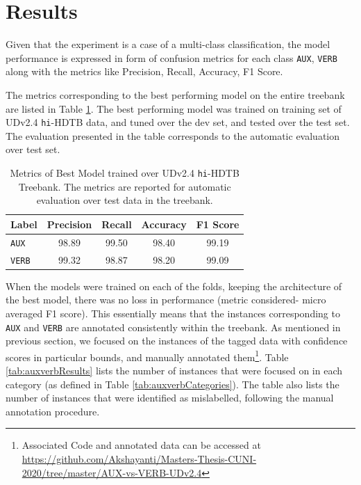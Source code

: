 \section{Results}
\label{ssec:auxverbResults}

Given that the experiment is a case of a multi-class classification, the model performance is expressed in form of confusion metrics for each class \verb|AUX|, \verb|VERB| along with the metrics like Precision, Recall, Accuracy, F1 Score.

The metrics corresponding to the best performing model on the entire treebank are listed in Table \ref{tab:auxverbBest}. The best performing model was trained on training set of UDv2.4 \texttt{hi}-HDTB data, and tuned over the dev set, and tested over the test set. The evaluation presented in the table corresponds to the automatic evaluation over test set.  

\begin{table}[ht]
\centering
    \begin{tabular}{|l|c|c|c|c|}
        \hline
        \textbf{Label} & \textbf{Precision} & \textbf{Recall} & \textbf{Accuracy} & \textbf{F1 Score} \\
        \hline
        \verb|AUX| & 98.89 & 99.50 & 98.40 & 99.19 \\
        \verb|VERB| & 99.32 & 98.87 & 98.20 & 99.09 \\
        \hline
    \end{tabular}
\caption[Metrics of Best Model trained over UDv2.4 \texttt{hi}-HDTB Treebank]{Metrics of Best Model trained over UDv2.4 \texttt{hi}-HDTB Treebank. The metrics are reported for automatic evaluation over test data in the treebank.}
\label{tab:auxverbBest}
\end{table}

When the models were trained on each of the folds, keeping the architecture of the best model, there was no loss in performance (metric considered- micro averaged F1 score). This essentially means that the instances corresponding to \texttt{AUX} and \texttt{VERB} are annotated consistently within the treebank. As mentioned in previous section, we focused on the instances of the tagged data with confidence scores in particular bounds, and manually annotated them\footnote{Associated Code and annotated data can be accessed at \url{https://github.com/Akshayanti/Masters-Thesis-CUNI-2020/tree/master/AUX-vs-VERB-UDv2.4}}. Table \ref{tab:auxverbResults} lists the number of instances that were focused on in each category (as defined in Table \ref{tab:auxverbCategories}). The table also lists the number of instances that were identified as mislabelled, following the manual annotation procedure.

